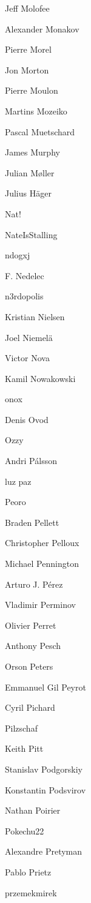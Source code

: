 \begin{DoxyItemize}
\item Jeff Molofee
\item Alexander Monakov
\item Pierre Morel
\item Jon Morton
\item Pierre Moulon
\item Martins Mozeiko
\item Pascal Muetschard
\item James Murphy
\item Julian Møller
\item Julius Häger
\item Nat!
\item Nate\+Is\+Stalling
\item ndogxj
\item F. Nedelec
\item n3rdopolis
\item Kristian Nielsen
\item Joel Niemelä
\item Victor Nova
\item Kamil Nowakowski
\item onox
\item Denis Ovod
\item Ozzy
\item Andri Pálsson
\item luz paz
\item Peoro
\item Braden Pellett
\item Christopher Pelloux
\item Michael Pennington
\item Arturo J. Pérez
\item Vladimir Perminov
\item Olivier Perret
\item Anthony Pesch
\item Orson Peters
\item Emmanuel Gil Peyrot
\item Cyril Pichard
\item Pilzschaf
\item Keith Pitt
\item Stanislav Podgorskiy
\item Konstantin Podsvirov
\item Nathan Poirier
\item Pokechu22
\item Alexandre Pretyman
\item Pablo Prietz
\item przemekmirek

\end{DoxyItemize}

